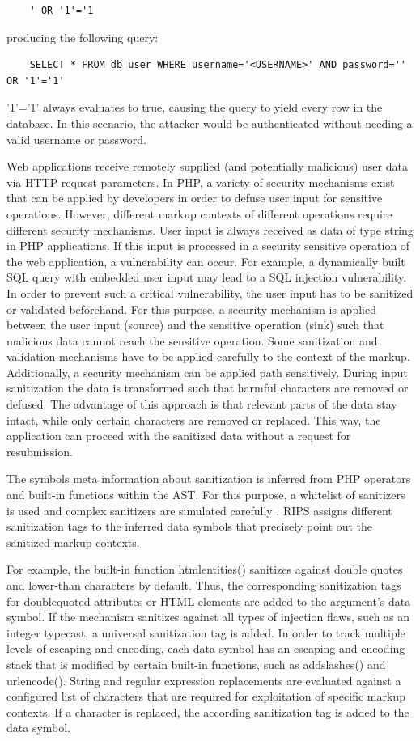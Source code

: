 \begin{lstlisting}
	' OR '1'='1
\end{lstlisting}
producing the following query:

\begin{lstlisting}
	SELECT * FROM db_user WHERE username='<USERNAME>' AND password='' OR '1'='1'
\end{lstlisting}
'1'='1' always evaluates to true, causing the query to yield every row in the database. In this scenario, the attacker would be authenticated without needing a valid username or password.

Web applications receive remotely supplied (and potentially
malicious) user data via HTTP request parameters. In PHP, a variety of security mechanisms exist that can be applied by developers in order to defuse user input for sensitive operations. However, different markup contexts of different operations require different security mechanisms.
User input is always received as data of type string in PHP applications. If this input is processed in a security sensitive 
operation of the web application, a vulnerability can
occur. For example, a dynamically built SQL query with
embedded user input may lead to a SQL injection vulnerability. In order to prevent such a critical vulnerability, the
user input has to be sanitized or validated beforehand. For
this purpose, a security mechanism is applied between the
user input (source) and the sensitive operation (sink) such
that malicious data cannot reach the sensitive operation.
Some sanitization and validation mechanisms have to be applied carefully to the context of the markup. Additionally, a security mechanism can be applied path sensitively. During input sanitization the data is
transformed such that harmful characters are removed or defused.
The advantage of this approach is that relevant parts of the data stay intact, while only certain characters are removed
or replaced. This way, the application can proceed
with the sanitized data without a request for resubmission.

The symbols meta information about sanitization is inferred
from PHP operators and built-in functions within the
AST. For this purpose, a whitelist of sanitizers is used and
complex sanitizers are simulated carefully \cite{ref_93_dahse2014simulation}. RIPS assigns
different sanitization tags to the inferred data symbols that
precisely point out the sanitized markup contexts.

For example, the built-in function htmlentities() sanitizes
against double quotes and lower-than characters by default.
Thus, the corresponding sanitization tags for doublequoted
attributes or HTML elements are added to the argument's
data symbol. If the mechanism sanitizes against all
types of injection flaws, such as an integer typecast, a universal
sanitization tag is added. In order to track multiple levels
of escaping and encoding, each data symbol has an escaping
and encoding stack that is modified by certain built-in
functions, such as addslashes() and urlencode(). String
and regular expression replacements are evaluated against a
configured list of characters that are required for exploitation
of specific markup contexts. If a character is replaced,
the according sanitization tag is added to the data symbol.


